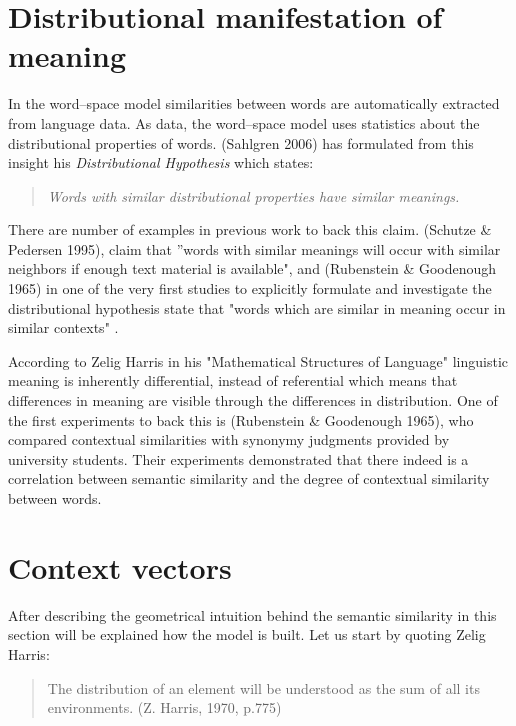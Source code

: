 \section{Distributional manifestation of meaning}
In the word--space model similarities between words are automatically extracted from language data. As data, the word--space model uses statistics about the distributional properties of words. (Sahlgren 2006) has formulated from this insight his \textit{Distributional Hypothesis} which states:
\begin{quotation}
\textit{Words with similar distributional properties have similar meanings.}
\end{quotation}
There are number of examples in previous work to back this claim. (Schutze \& Pedersen 1995), claim that  ''words with similar meanings will occur with similar neighbors if enough text material is available", and (Rubenstein \& Goodenough 1965) in one of the very first studies to explicitly formulate and investigate the distributional hypothesis state that  "words which are similar in meaning occur in similar contexts" .

According to Zelig Harris in his "Mathematical Structures of Language" linguistic meaning is inherently 
differential, instead of referential which means that differences in meaning are visible through the 
differences in distribution. One of the first experiments to back this is (Rubenstein \& Goodenough 1965), who compared contextual similarities with synonymy judgments provided by university students. Their experiments demonstrated that there indeed is a correlation between semantic similarity and the degree of contextual similarity between words.

\section{Context vectors}
After describing the geometrical intuition behind the semantic similarity in this section will be explained how the model is built. Let us start by quoting Zelig Harris:
\begin{quotation}
The distribution of an element will be understood as the sum of all its environments. (Z. Harris, 1970, p.775)
\end{quotation}

